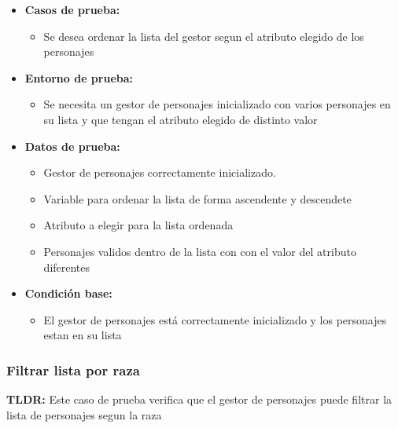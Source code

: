 \documentclass{article}
\begin{document}
\begin{itemize}
	\item \textbf{Casos de prueba:}
	\begin{itemize}
		\item Se desea ordenar la lista del gestor segun el atributo elegido de los personajes
	\end{itemize}
	
	\item \textbf{Entorno de prueba:}
	\begin{itemize}
		\item Se necesita un gestor de personajes inicializado con varios personajes en su lista y que tengan el atributo elegido de distinto valor
	\end{itemize}
	
	\item \textbf{Datos de prueba:}
	\begin{itemize}
		\item Gestor de personajes correctamente inicializado.
        \item Variable para ordenar la lista de forma ascendente y descendete
        \item Atributo a elegir para la lista ordenada
		\item Personajes validos dentro de la lista con con el valor del atributo diferentes
	\end{itemize}
	
	\item \textbf{Condición base:}
	\begin{itemize}
		\item El gestor de personajes está correctamente inicializado y los personajes estan en su lista
	\end{itemize}
	
\end{itemize}

\subsubsection{Filtrar lista por raza}
\textbf{TLDR:} Este caso de prueba verifica que el gestor de personajes puede filtrar la lista de personajes segun la raza 
\end{document}
